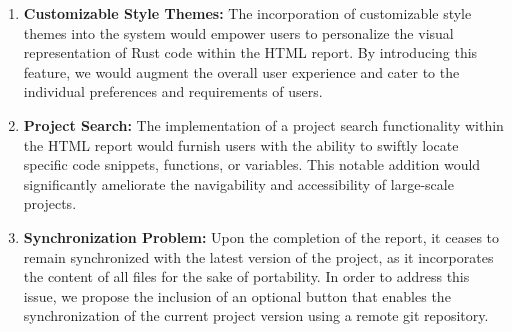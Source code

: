 \begin{enumerate}
\item \textbf{Customizable Style Themes:} The incorporation of customizable style themes into the system would empower users to personalize the visual representation of Rust code within the HTML report. By introducing this feature, we would augment the overall user experience and cater to the individual preferences and requirements of users.

\item \textbf{Project Search:} The implementation of a project search functionality within the HTML report would furnish users with the ability to swiftly locate specific code snippets, functions, or variables. This notable addition would significantly ameliorate the navigability and accessibility of large-scale projects.

\item \textbf{Synchronization Problem:} Upon the completion of the report, it ceases to remain synchronized with the latest version of the project, as it incorporates the content of all files for the sake of portability. In order to address this issue, we propose the inclusion of an optional button that enables the synchronization of the current project version using a remote git repository.
\end{enumerate}